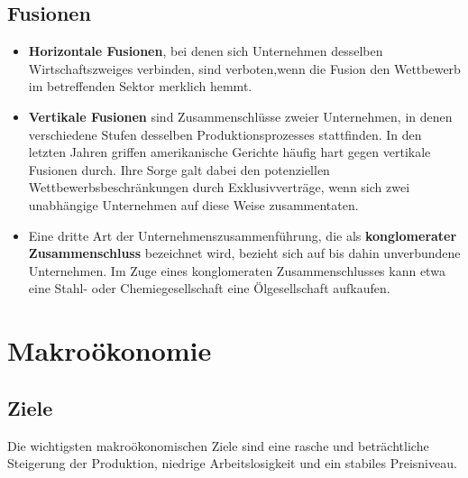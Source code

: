 \documentclass[10pt]{scrartcl}
\begin{document}
\subsection{Fusionen}
\begin{itemize}
\item {\bf Horizontale Fusionen}, bei denen sich Unternehmen desselben Wirtschaftszweiges verbinden, sind verboten,wenn die Fusion den  Wettbewerb im betreffenden Sektor merklich hemmt. 
\item {\bf Vertikale Fusionen} sind Zusammenschlüsse zweier Unternehmen, in denen verschiedene Stufen desselben Produktionsprozesses stattfinden. In den letzten Jahren griffen amerikanische Gerichte häufig hart gegen vertikale Fusionen durch. Ihre Sorge galt dabei den potenziellen Wettbewerbsbeschränkungen durch Exklusivverträge, wenn sich zwei unabhängige Unternehmen auf diese Weise zusammentaten.
\item Eine dritte Art der Unternehmenszusammenführung, die als {\bf konglomerater Zusammenschluss}  bezeichnet wird, bezieht sich auf bis dahin unverbundene Unternehmen. Im Zuge eines konglomeraten Zusammenschlusses kann etwa eine Stahl- oder Chemiegesellschaft eine Ölgesellschaft aufkaufen.
\end{itemize}

\section{Makroökonomie}
\subsection{Ziele}
Die wichtigsten makroökonomischen Ziele sind eine rasche und beträchtliche Steigerung der Produktion, niedrige Arbeitslosigkeit und ein stabiles Preisniveau.
\end{document}
